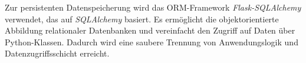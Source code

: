 Zur persistenten Datenspeicherung wird das ORM-Framework \textit{Flask-SQLAlchemy} verwendet, das auf \textit{SQLAlchemy} basiert.
Es ermöglicht die objektorientierte Abbildung relationaler Datenbanken und vereinfacht den Zugriff auf Daten über Python-Klassen.
Dadurch wird eine saubere Trennung von Anwendungslogik und Datenzugriffsschicht erreicht.


